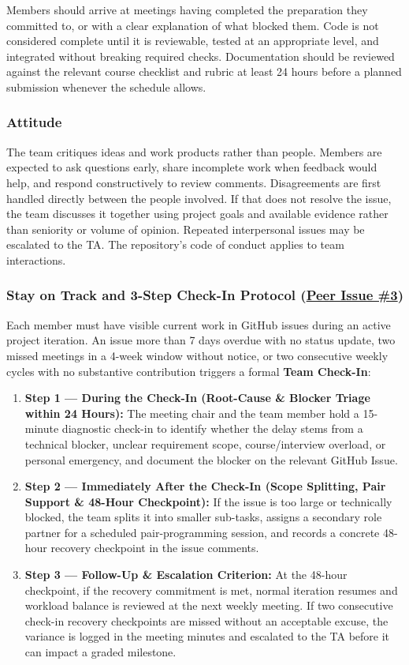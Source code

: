\documentclass{article}
\begin{document}
Members should arrive at meetings having completed the preparation they committed to, or with a clear explanation of what blocked them. Code is not considered complete until it is reviewable, tested at an appropriate level, and integrated without breaking required checks. Documentation should be reviewed against the relevant course checklist and rubric at least 24 hours before a planned submission whenever the schedule allows.

\subsubsection*{Attitude}

The team critiques ideas and work products rather than people. Members are expected to ask questions early, share incomplete work when feedback would help, and respond constructively to review comments. Disagreements are first handled directly between the people involved. If that does not resolve the issue, the team discusses it together using project goals and available evidence rather than seniority or volume of opinion. Repeated interpersonal issues may be escalated to the TA. The repository's code of conduct applies to team interactions.

\subsubsection*{Stay on Track and 3-Step Check-In Protocol (\href{https://github.com/richy1337/Verity/issues/3}{Peer Issue \#3})}

Each member must have visible current work in GitHub issues during an active project iteration. An issue more than 7 days overdue with no status update, two missed meetings in a 4-week window without notice, or two consecutive weekly cycles with no substantive contribution triggers a formal \textbf{Team Check-In}:
\begin{enumerate}[leftmargin=*]
    \item \textbf{Step 1 --- During the Check-In (Root-Cause \& Blocker Triage within 24 Hours):} The meeting chair and the team member hold a 15-minute diagnostic check-in to identify whether the delay stems from a technical blocker, unclear requirement scope, course/interview overload, or personal emergency, and document the blocker on the relevant GitHub Issue.
    \item \textbf{Step 2 --- Immediately After the Check-In (Scope Splitting, Pair Support \& 48-Hour Checkpoint):} If the issue is too large or technically blocked, the team splits it into smaller sub-tasks, assigns a secondary role partner for a scheduled pair-programming session, and records a concrete 48-hour recovery checkpoint in the issue comments.
    \item \textbf{Step 3 --- Follow-Up \& Escalation Criterion:} At the 48-hour checkpoint, if the recovery commitment is met, normal iteration resumes and workload balance is reviewed at the next weekly meeting. If two consecutive check-in recovery checkpoints are missed without an acceptable excuse, the variance is logged in the meeting minutes and escalated to the TA before it can impact a graded milestone.
\end{enumerate}
\end{document}
